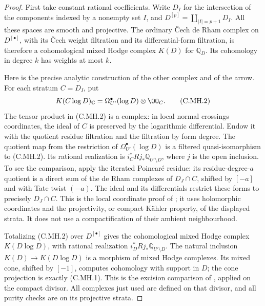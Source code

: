 \begin{proof}
First take constant rational coefficients. Write $D_I$
for the intersection of the components indexed by a
nonempty set $I$, and $D^{[p]}=\coprod_{|I|=p+1}D_I$.
All these spaces are smooth and projective. The ordinary
\v Cech de Rham complex on $D^{[\bullet]}$, with its
\v Cech weight filtration and its differential-form
filtration, is therefore a cohomological mixed Hodge
complex $K(D)$ for $\mathbb Q_D$. Its cohomology in
degree $k$ has weights at most $k$.

Here is the precise analytic construction of the other
complex and of the arrow. For each stratum $C=D_I$, put
\[
 K(C\log D)_{\mathbb C}
   =\Omega_{U'}^\bullet(\log D)\otimes\OO_C.
 \tag{C.MH.2}
\]
The tensor product in (C.MH.2) is a complex: in local
normal crossings coordinates, the ideal of $C$ is
preserved by the logarithmic differential. Endow it with
the quotient residue filtration and the filtration by
form degree. The quotient map from the restriction of
$\Omega_{U'}^\bullet(\log D)$ is a filtered
quasi-isomorphism to (C.MH.2). Its rational realization is
$i_C^*Rj_*\mathbb Q_{U'\setminus D}$, where $j$ is the
open inclusion. To see the comparison, apply the
iterated Poincar\'e residue: its residue-degree-$a$
quotient is a direct sum of the de Rham complexes of
$D_J\cap C$, shifted by $[-a]$ and with Tate twist
$(-a)$. The ideal and its differentials restrict these
forms to precisely $D_J\cap C$. This is the local
coordinate proof of \cite[Section~3, Theorem~1 and
Corollary~2]{Steenbrink1999}; it uses holomorphic
coordinates and the projectivity, or compact K\"ahler
property, of the displayed strata. It does not use a
compactification of their ambient neighbourhood.

Totalizing (C.MH.2) over $D^{[\bullet]}$ gives the
cohomological mixed Hodge complex $K(D\log D)$, with
rational realization $i_D^*Rj_*\mathbb Q_{U'\setminus D}$.
The natural inclusion $K(D)\to K(D\log D)$ is a
morphism of mixed Hodge complexes. Its mixed cone,
shifted by $[-1]$, computes cohomology with support in
$D$; the cone projection is exactly (C.MH.1). This is
the excision comparison of
\cite[Section~4, equation~(3)]{Steenbrink1999}, applied
on the compact divisor. All complexes just used are
defined on that divisor, and all purity checks are on
its projective strata.


\end{proof}
